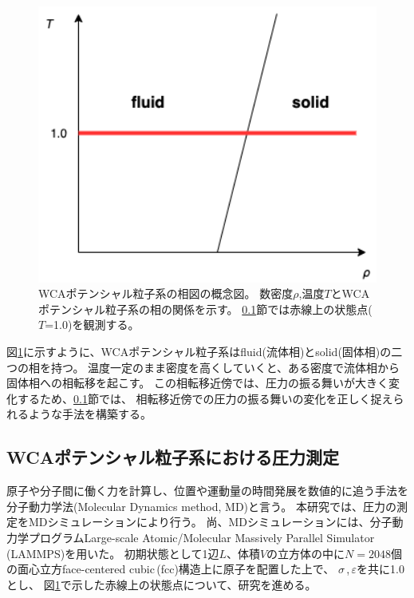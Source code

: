 \documentclass[titlepage]{jsreport}
\begin{document}
{{{\begin{figure}[htbp]
    \begin{center}
        \includegraphics[width=12cm]{fig/wca-phase-diagram.png}
    \end{center}
    \caption{WCAポテンシャル粒子系の相図の概念図。
    数密度$\rho$,温度$T$とWCAポテンシャル粒子系の相の関係を示す。
    \ref{method-subsec:WCA-pressure}節では赤線上の状態点($T$=1.0)を観測する。}
    \label{fig:wca-phase-diagram}
\end{figure}

\newpage
図\ref{fig:wca-phase-diagram}に示すように、WCAポテンシャル粒子系はfluid(流体相)とsolid(固体相)の二つの相を持つ。
温度一定のまま密度を高くしていくと、ある密度で流体相から固体相への相転移を起こす。
この相転移近傍では、圧力の振る舞いが大きく変化するため、\ref{method-subsec:WCA-pressure}節では、
相転移近傍での圧力の振る舞いの変化を正しく捉えられるような手法を構築する。


\subsection{WCAポテンシャル粒子系における圧力測定}\label{method-subsec:WCA-pressure}
原子や分子間に働く力を計算し、位置や運動量の時間発展を数値的に追う手法を分子動力学法(Molecular Dynamics method, MD)と言う\cite{molecular-dynamics}。
本研究では、圧力の測定をMDシミュレーションにより行う。
尚、MDシミュレーションには、分子動力学プログラムLarge-scale Atomic/Molecular Massively Parallel Simulator\,(LAMMPS)\cite{lammps}を用いた。
初期状態として1辺$L$、体積$V$の立方体の中に$N=2048$個の面心立方face-centered cubic\,(fcc)構造上に原子を配置した上で、
${\sigma}$\,,\,${\varepsilon}$を共に1.0とし、
図\ref{fig:wca-phase-diagram}で示した赤線上の状態点について、研究を進める。

}}}
\end{document}
